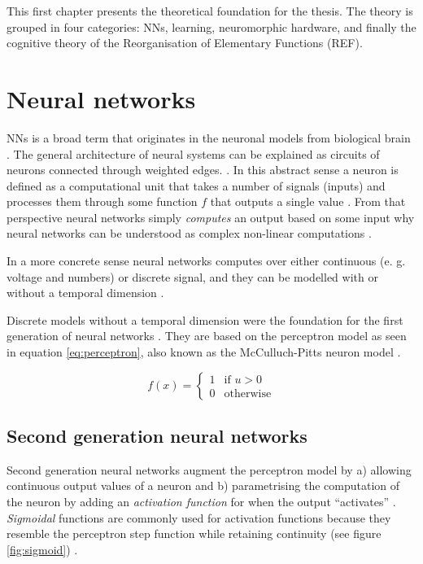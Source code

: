 \documentclass[report.tex]{subfiles}
\begin{document}
This first chapter presents the theoretical foundation for the thesis.
The theory is grouped in four categories: \gls{NN}s, learning,
neuromorphic hardware,  and finally
the cognitive theory of the Reorganisation of Elementary Functions
(\gls{REF}).


\section{Neural networks} \label{sec:nn}
\Gls{NN}s is a broad term that originates in the neuronal models from
biological brain \cite{Dayan2001}.
The general architecture of neural systems can be explained as circuits
of neurons  connected through weighted edges.
\cite{Russel2007, Dayan2001}.
In this abstract sense a neuron is defined as a computational unit that
takes a number of signals (inputs) and processes them through some
function $f$ that outputs a single value \cite{Eliasmith2004}.
From that perspective neural networks simply \textit{computes} an 
output based on some input why neural networks can be understood as
complex non-linear computations \cite{Eliasmith2004, Dayan2001}.

In a more concrete sense neural networks computes over either
continuous (e. g. voltage and numbers) or discrete signal, and they
can be modelled with or without a temporal dimension
\cite{Eliasmith2004, Russel2007, Schmidhuber2014}.

Discrete models without a temporal dimension were the foundation for
the first generation of neural networks \cite{Russel2007, Maass1997}.
They are based on the perceptron model as seen in equation
\ref{eq:perceptron}, also known as the McCulluch-Pitts neuron model
\cite{Eliasmith2004}.

\begin{equation} \label{eq:perceptron}
f(x) = \begin{cases}
	 1 & \text{if } u > 0\\
	 0 & \text{otherwise}
       \end{cases}
\end{equation}

\subsection{Second generation neural networks}
Second generation neural networks augment the perceptron model by
a) allowing continuous output values of a neuron and b) parametrising
the computation of the neuron by adding an \textit{activation function}
 for when the output ``activates'' 
\cite{Maass1997}.
\textit{Sigmoidal} functions are commonly used for activation functions
because they resemble the perceptron step function while 
retaining continuity (see figure \ref{fig:sigmoid})
\cite{Maass1997}.
\end{document}
